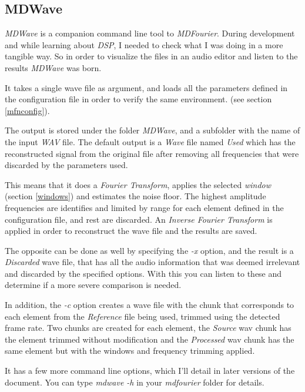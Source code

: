 \documentclass[10pt,a4paper]{report}
\begin{document}
\begin{appendices}
	
\chapter{MDWave}
\label{mdwave}

\textit{MDWave} is a companion command line tool to \textit{MDFourier}. During development and while learning about \textit{DSP}, I needed to check what I was doing in a more tangible way. So in order to visualize the files in an audio editor and listen to the results \textit{MDWave} was born.

It takes a single wave file as argument, and loads all the parameters defined in the configuration file in order to verify the same environment. (see section \ref{mfnconfig}).

The output is stored under the folder \textit{MDWave}, and a subfolder with the name of the input \textit{WAV} file. The default output is a \textit{Wave} file named \textit{Used} which has the reconstructed signal from the original file after removing all frequencies that were discarded by the parameters used.

This means that it does a \textit{Fourier Transform}, applies the selected \textit{window} (section \ref{windows}) and estimates the noise floor. The highest amplitude frequencies are identifies and limited by range for each element defined in the configuration file, and rest are discarded. An \textit{Inverse Fourier Transform} is applied in order to reconstruct the wave file and the results are saved.

The opposite can be done as well by specifying the \textit{-x} option, and the result is a \textit{Discarded} wave file, that has all the audio information that was deemed irrelevant and discarded by the specified options. With this you can listen to these and determine if a more severe comparison is needed.

In addition, the \textit{-c} option creates a wave file with the chunk that corresponds to each element from the \textit{Reference} file being used, trimmed using the detected frame rate. Two chunks are created for each element, the \textit{Source} wav chunk has the element trimmed without modification and the \textit{Processed} wav chunk has the same element but with the windows and frequency trimming applied.

It has a few more command line options, which I'll detail in later versions of the document. You can type \textit{mdwave -h} in your \textit{mdfourier} folder for details.
	

\end{appendices}
\end{document}
